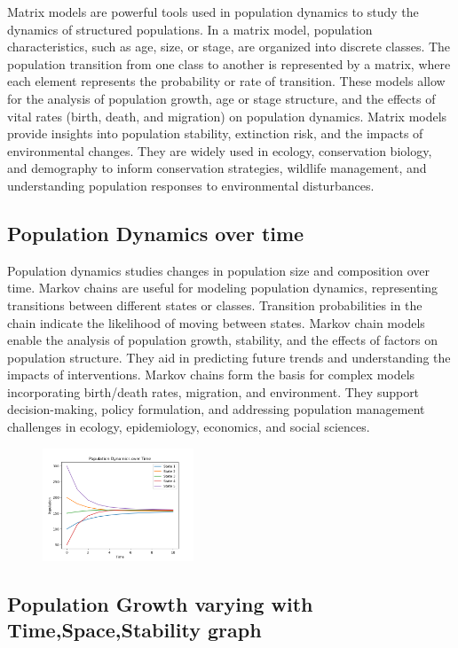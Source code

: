 \documentclass[12pt]{article}
\begin{document}
Matrix models are powerful tools used in population dynamics to study the dynamics of structured populations. In a matrix model, population characteristics, such as age, size, or stage, are organized into discrete classes. The population transition from one class to another is represented by a matrix, where each element represents the probability or rate of transition. These models allow for the analysis of population growth, age or stage structure, and the effects of vital rates (birth, death, and migration) on population dynamics. Matrix models provide insights into population stability, extinction risk, and the impacts of environmental changes. They are widely used in ecology, conservation biology, and demography to inform conservation strategies, wildlife management, and understanding population responses to environmental disturbances.
\subsection{Population Dynamics over time}
Population dynamics studies changes in population size and composition over time. Markov chains are useful for modeling population dynamics, representing transitions between different states or classes. Transition probabilities in the chain indicate the likelihood of moving between states. Markov chain models enable the analysis of population growth, stability, and the effects of factors on population structure. They aid in predicting future trends and understanding the impacts of interventions. Markov chains form the basis for complex models incorporating birth/death rates, migration, and environment. They support decision-making, policy formulation, and addressing population management challenges in ecology, epidemiology, economics, and social sciences.
\begin{figure}[H]
  \centering
  \includegraphics[width=0.4\textwidth]{Figure_3.png}
\end{figure}

\subsection{Population Growth varying with Time,Space,Stability graph}
\end{document}
